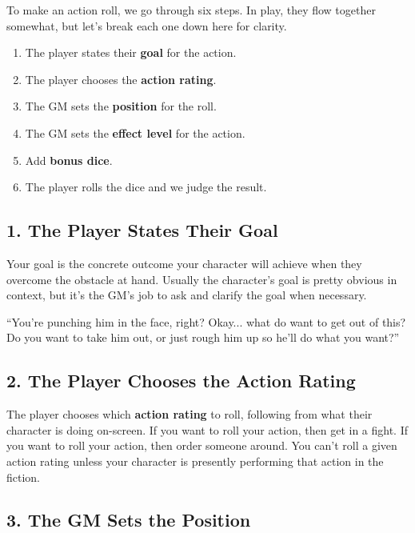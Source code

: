 To make an action roll, we go through six steps. In play, they flow together somewhat, but let’s break each one down here for clarity.

\begin{enumerate}
\item    The player states their \textbf{goal} for the action.
\item    The player chooses the \textbf{action rating}.
\item    The GM sets the \textbf{position} for the roll.
\item    The GM sets the \textbf{effect level} for the action.
\item    Add \textbf{bonus dice}.
\item    The player rolls the dice and we judge the result.
\end{enumerate}

\subsection{1. The Player States Their Goal}

Your goal is the concrete outcome your character will achieve when they overcome the obstacle at hand. Usually the character’s goal is pretty obvious in context, but it’s the GM’s job to ask and clarify the goal when necessary.

\begin{qb}``You’re punching him in the face, right? Okay... what do want to get out of this? Do you want to take him out, or just rough him up so he’ll do what you want?''\end{qb}

\subsection{2. The Player Chooses the Action Rating}

The player chooses which \textbf{action rating} to roll, following from what their character is doing on-screen. If you want to roll your  action, then get in a fight. If you want to roll your  action, then order someone around. You can’t roll a given action rating unless your character is presently performing that action in the fiction.

\subsection{3. The GM Sets the Position}

